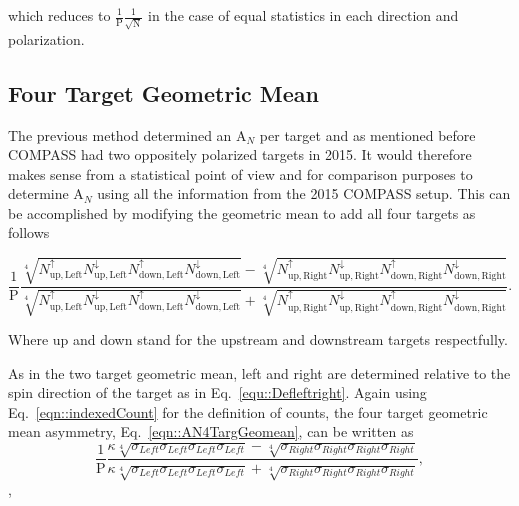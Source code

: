 \noindent
which reduces to $\frac{1}{\mathrm{P}}\frac{1}{\sqrt{\mathrm{N}}}$ in the case
of equal statistics in each direction and polarization.

\subsection{Four Target Geometric Mean}
The previous method determined an A$_N$ per target and as mentioned before
COMPASS had two oppositely polarized targets in 2015.  It would therefore makes
sense from a statistical point of view and for comparison purposes to determine
A$_N$ using all the information from the 2015 COMPASS setup.  This can be
accomplished by modifying the geometric mean to add all four targets as follows

\begin{equation}
    \label{eqn::AN4TargGeomean}
    \frac{1}{\mathrm{P}}
    \frac{
      \sqrt[4]{
        N_{\mathrm{up,Left}}^{\uparrow}N_{\mathrm{up, Left}}^{\downarrow}
        N_{\mathrm{down,Left}}^{\uparrow}N_{\mathrm{down, Left}}^{\downarrow}
      } -
      \sqrt[4]{
        N_{\mathrm{up,Right}}^{\uparrow}N_{\mathrm{up, Right}}^{\downarrow}
        N_{\mathrm{down,Right}}^{\uparrow}N_{\mathrm{down, Right}}^{\downarrow}
      }
    }{
      \sqrt[4]{
        N_{\mathrm{up,Left}}^{\uparrow}N_{\mathrm{up, Left}}^{\downarrow}
        N_{\mathrm{down,Left}}^{\uparrow}N_{\mathrm{down, Left}}^{\downarrow}
      } +
      \sqrt[4]{
        N_{\mathrm{up,Right}}^{\uparrow}N_{\mathrm{up, Right}}^{\downarrow}
        N_{\mathrm{down,Right}}^{\uparrow}N_{\mathrm{down, Right}}^{\downarrow}
      }
    }.
\end{equation}

\noindent
Where up and down stand for the upstream and downstream targets respectfully.

As in the two target geometric mean, left and right are determined relative to
the spin direction of the target as in Eq.~\ref{equ::Defleftright}.  Again using
Eq.~\ref{eqn::indexedCount} for the definition of counts, the four target
geometric mean asymmetry, Eq.~\ref{eqn::AN4TargGeomean}, can be written as
\begin{equation}
  \frac{1}{\mathrm{P}}
  \frac{
    \kappa \sqrt[4]{\sigma_{Left}\sigma_{Left}\sigma_{Left}\sigma_{Left}} -
    \sqrt[4]{\sigma_{Right}\sigma_{Right}\sigma_{Right}\sigma_{Right}}
  }{
    \kappa \sqrt[4]{\sigma_{Left}\sigma_{Left}\sigma_{Left}\sigma_{Left}} +
    \sqrt[4]{\sigma_{Right}\sigma_{Right}\sigma_{Right}\sigma_{Right}}
  },
\end{equation},

